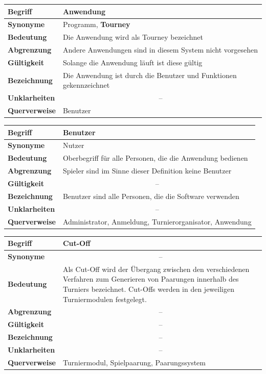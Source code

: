 \documentclass[11pt]{article}
\begin{document}
\newpage

\begin{tabularx}{\textwidth}{| p{} | p{} |}
	\hline
	\textbf{Begriff} & Anwendung\\
	\hline
	\textbf{Synonyme} & Programm, \textbf{Tourney}\\
	\hline
	\textbf{Bedeutung} & Die Anwendung wird als Tourney bezeichnet\\
	\hline
	\textbf{Abgrenzung} & Andere Anwendungen sind in diesem System nicht vorgesehen\\
	\hline
	\textbf{Gültigkeit} & Solange die Anwendung läuft ist diese gültig\\
	\hline
	\textbf{Bezeichnung} & Die Anwendung ist durch die Benutzer und Funktionen gekennzeichnet\\
	\hline
	\textbf{Unklarheiten} & \multicolumn{1}{c|}{--} \\
	\hline
	\textbf{Querverweise} & Benutzer \\
	\hline
\end{tabularx}

\begin{tabularx}{\textwidth}{| p{} | p{} |}
	\hline
	\textbf{Begriff} & Benutzer\\
	\hline
	\textbf{Synonyme} & Nutzer\\
	\hline
	\textbf{Bedeutung} & Oberbegriff für alle Personen, die die Anwendung bedienen\\
	\hline
	\textbf{Abgrenzung} & Spieler sind im Sinne dieser Definition keine Benutzer \\
	\hline
	\textbf{Gültigkeit} & \multicolumn{1}{c|}{--} \\
	\hline
	\textbf{Bezeichnung} & Benutzer sind alle Personen, die die Software verwenden\\
	\hline
	\textbf{Unklarheiten} & \multicolumn{1}{c|}{--} \\
	\hline
	\textbf{Querverweise} & Administrator, Anmeldung, Turnierorganisator, Anwendung\\
	\hline
\end{tabularx}

\begin{tabularx}{\textwidth}{| p{} | p{} |}
	\hline
	\textbf{Begriff} & Cut-Off\\
	\hline
	\textbf{Synonyme} & \multicolumn{1}{c|}{--} \\
	\hline
	\textbf{Bedeutung} & Als Cut-Off wird der Übergang zwischen den verschiedenen Verfahren zum Generieren von Paarungen innerhalb des Turniers bezeichnet. Cut-Offs werden in den jeweiligen Turniermodulen festgelegt.\\
	\hline
	\textbf{Abgrenzung} & \multicolumn{1}{c|}{--} \\
	\hline
	\textbf{Gültigkeit} & \multicolumn{1}{c|}{--} \\
	\hline
	\textbf{Bezeichnung} & \multicolumn{1}{c|}{--} \\
	\hline
	\textbf{Unklarheiten} & \multicolumn{1}{c|}{--} \\
	\hline
	\textbf{Querverweise} & Turniermodul, Spielpaarung, Paarungssystem\\
	\hline
\end{tabularx}
\end{document}
